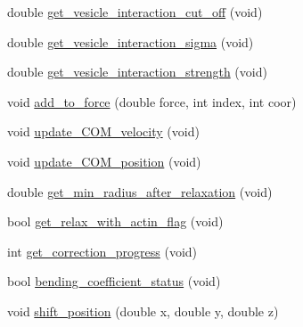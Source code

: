 \begin{DoxyCompactItemize}
double \mbox{\hyperlink{classMembrane_ac8de522542c4c2c68ea489ce13a79bb5}{get\+\_\+vesicle\+\_\+interaction\+\_\+cut\+\_\+off}} (void)
\item 
double \mbox{\hyperlink{classMembrane_a42b4b787240cc27329218909bf790409}{get\+\_\+vesicle\+\_\+interaction\+\_\+sigma}} (void)
\item 
double \mbox{\hyperlink{classMembrane_a77171793ae4115a603f57f3472868ff8}{get\+\_\+vesicle\+\_\+interaction\+\_\+strength}} (void)
\item 
void \mbox{\hyperlink{classMembrane_a7524333ddca2039be9931fad57135fad}{add\+\_\+to\+\_\+force}} (double force, int index, int coor)
\item 
void \mbox{\hyperlink{classMembrane_aa1bb3ec5f5b6c6451e2f72103fbdde08}{update\+\_\+\+C\+O\+M\+\_\+velocity}} (void)
\item 
void \mbox{\hyperlink{classMembrane_ad7368b7721d9279f54a7dece975ee152}{update\+\_\+\+C\+O\+M\+\_\+position}} (void)
\item 
double \mbox{\hyperlink{classMembrane_a629f4f8d87ef7b83130cf18e8de060bb}{get\+\_\+min\+\_\+radius\+\_\+after\+\_\+relaxation}} (void)
\item 
bool \mbox{\hyperlink{classMembrane_a3030a224f8b882e0bdec2d1fd6861304}{get\+\_\+relax\+\_\+with\+\_\+actin\+\_\+flag}} (void)
\item 
int \mbox{\hyperlink{classMembrane_ad3960f87e60282211a1266f4d3318dc0}{get\+\_\+correction\+\_\+progress}} (void)
\item 
bool \mbox{\hyperlink{classMembrane_af1621cec0f4c59ded7978719e64c6d39}{bending\+\_\+coefficient\+\_\+status}} (void)
\item 
void \mbox{\hyperlink{classMembrane_aae01bd33119728d0b268081bee3815e7}{shift\+\_\+position}} (double x, double y, double z)
\end{DoxyCompactItemize}

